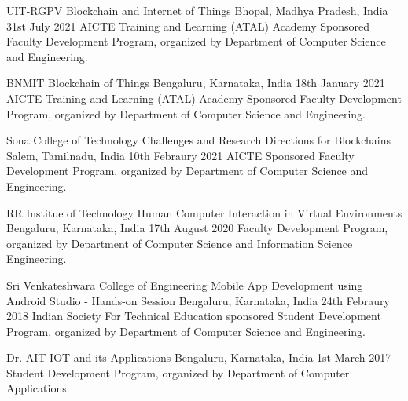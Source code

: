 

\begin{cventries}

  \cventry
    {UIT-RGPV} %
    {Blockchain and Internet of Things} %
    {Bhopal, Madhya Pradesh, India} %
    {31st July 2021} %
    {AICTE Training and Learning (ATAL) Academy Sponsored Faculty Development Program, organized by Department of Computer Science and Engineering.}
    
    
    \cventry
    {BNMIT} %
    {Blockchain of Things} %
    {Bengaluru, Karnataka, India} %
    {18th January 2021} %
    {AICTE Training and Learning (ATAL) Academy Sponsored Faculty Development Program, organized by Department of Computer Science and Engineering.}
    
    \cventry
    {Sona College of Technology} %
    {Challenges and Research Directions for Blockchains} %
    {Salem, Tamilnadu, India} %
    {10th Febraury 2021} %
    {AICTE Sponsored Faculty Development Program, organized by Department of Computer Science and Engineering.}
    
    \cventry
    {RR Institue of Technology} %
    {Human Computer Interaction in Virtual Environments} %
    {Bengaluru, Karnataka, India} %
    {17th August 2020} %
    {Faculty Development Program, organized by Department of Computer Science and Information Science Engineering.}
    
    \cventry
    {Sri Venkateshwara College of Engineering} %
    {Mobile App Development using Android Studio - Hands-on Session} %
    {Bengaluru, Karnataka, India} %
    {24th Febraury 2018} %
    {Indian Society For Technical Education sponsored Student Development Program, organized by Department of Computer Science and Engineering.}
    
     \cventry
    {Dr. AIT} %
    {IOT and its Applications} %
    {Bengaluru, Karnataka, India} %
    {1st March 2017} %
    {Student Development Program, organized by Department of Computer Applications.}
    

\end{cventries}

